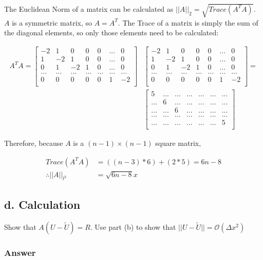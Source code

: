 \documentclass{article}
\begin{document}
		The Euclidean Norm of a matrix can be calculated as $||A||_{2}=\sqrt{Trace(A^{T}A)}$\cite{FNorm}.  $A$ is a symmetric matrix, so $A=A^{T}$.  The Trace of a matrix is simply the sum of the diagonal elements, so only those elements need to be calculated:
		
		\begin{align*}
			A^{T}A=
			\begin{bmatrix}
			-2&1&0&0&0&...&0\\
			1&-2&1&0&0&...&0\\
			0&1&-2&1&0&...&0\\
			...&...&...&...&...&...&...\\
			0&0&0&0&0&1&-2\\
			\end{bmatrix}&
			\begin{bmatrix}
			-2&1&0&0&0&...&0\\
			1&-2&1&0&0&...&0\\
			0&1&-2&1&0&...&0\\
			...&...&...&...&...&...&...\\
			0&0&0&0&0&1&-2\\
			\end{bmatrix}=\\
			&\begin{bmatrix}
			5&...&...&...&...&...&...\\
			...&6&...&...&...&...&...\\
			...&...&6&...&...&...&...\\
			...&...&...&...&...&...&...\\
			...&...&...&...&...&...&5\\
			\end{bmatrix}
		\end{align*}
		
		Therefore, because $A$ is a $(n-1)\times(n-1)$ square matrix, 
		
		\begin{align*}
			Trace(A^{T}A)&=((n-3)*6)+(2*5)=6n-8\\
			\therefore ||A||_{l^{2}}&=\sqrt{6n-8}x
		\end{align*}
		
	\subsection{d. Calculation}
		Show that $A(U-\tilde{U})=R$.  Use part (b) to show that $||U-\tilde{U}||=\mathcal{O}(\Delta x^{2})$
	
		\subsubsection{Answer}
	
\end{document}
